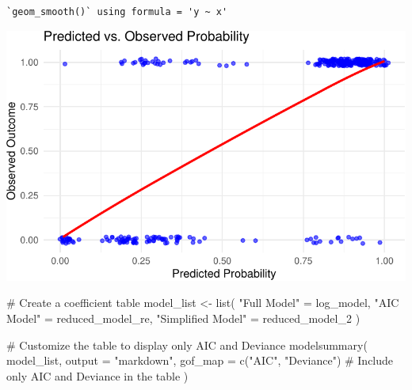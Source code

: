 \documentclass[
  letterpaper,
  DIV=11,
  numbers=noendperiod]{scrartcl}
\newenvironment{Shaded}{\begin{snugshade}}{\end{snugshade}}
\newcommand{\AttributeTok}[1]{\textcolor[rgb]{0.40,0.45,0.13}{#1}}
\newcommand{\CommentTok}[1]{\textcolor[rgb]{0.37,0.37,0.37}{#1}}
\newcommand{\FunctionTok}[1]{\textcolor[rgb]{0.28,0.35,0.67}{#1}}
\newcommand{\NormalTok}[1]{\textcolor[rgb]{0.00,0.23,0.31}{#1}}
\newcommand{\OtherTok}[1]{\textcolor[rgb]{0.00,0.23,0.31}{#1}}
\newcommand{\StringTok}[1]{\textcolor[rgb]{0.13,0.47,0.30}{#1}}
\begin{document}
\begin{verbatim}
`geom_smooth()` using formula = 'y ~ x'
\end{verbatim}

\includegraphics{paper_files/figure-pdf/unnamed-chunk-19-1.pdf}

\begin{Shaded}
\begin{Highlighting}[]
\CommentTok{\# Create a coefficient table}
\NormalTok{model\_list }\OtherTok{\textless{}{-}} \FunctionTok{list}\NormalTok{(}
  \StringTok{"Full Model"} \OtherTok{=}\NormalTok{ log\_model,}
  \StringTok{"AIC Model"} \OtherTok{=}\NormalTok{ reduced\_model\_re,}
  \StringTok{"Simplified Model"} \OtherTok{=}\NormalTok{ reduced\_model\_2}
\NormalTok{)}

\CommentTok{\# Customize the table to display only AIC and Deviance}
\FunctionTok{modelsummary}\NormalTok{(}
\NormalTok{  model\_list,}
  \AttributeTok{output =} \StringTok{"markdown"}\NormalTok{,}
  \AttributeTok{gof\_map =} \FunctionTok{c}\NormalTok{(}\StringTok{"AIC"}\NormalTok{, }\StringTok{"Deviance"}\NormalTok{)  }\CommentTok{\# Include only AIC and Deviance in the table}
\NormalTok{)}
\end{Highlighting}
\end{Shaded}
\end{document}

